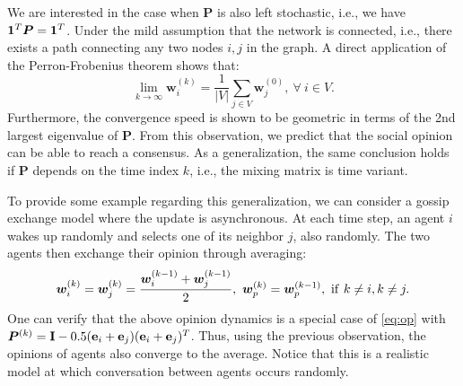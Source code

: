 \documentclass[10pt]{article}
\theoremstyle{t}
\begin{document}
We are interested in the case when ${\bm P}$ is also left stochastic, i.e., we have ${\bf 1}^T {\bm P} = {\bf 1}^T$. Under the mild assumption that the network is connected, i.e., there exists a path connecting any two nodes $i,j$ in the graph. A direct application of the Perron-Frobenius theorem shows that:
\[
\lim_{k \rightarrow \infty} {\bm w}_i^{(k)} = \frac{1}{|V|} \sum_{j \in V} {\bm w}_j^{(0)},~\forall~i \in V.
\]
Furthermore, the convergence speed is shown to be geometric in terms of the 2nd largest eigenvalue of ${\bm P}$.  From this observation, we predict that the social opinion can be able to reach a consensus. As a generalization, the same conclusion holds if ${\bm P}$ depends on the time index $k$, i.e., the mixing matrix is time variant. \vspace{.2cm}

To provide some example regarding this generalization, we can consider a gossip exchange model where the update is asynchronous. At each time step, an agent $i$ wakes up randomly and selects one of its neighbor $j$, also randomly. The two agents then exchange their opinion through averaging:
\[
{\bm w}_i^{(k)} = {\bm w}_j^{(k)} = \frac{{\bm w}_i^{(k-1)} + {\bm w}_j^{(k-1)} }{2},~{\bm w}_p^{(k)} = {\bm w}_p^{(k-1)},~{\rm if}~k \neq i, k \neq j.
\] 
One can verify that the above opinion dynamics is a special case of \eqref{eq:op} with ${\bm P}^{(k)} = {\bf I} - 0.5({\bf e}_i + {\bf e}_j)({\bf e}_i + {\bf e}_j)^T$. Thus, using the previous observation, the opinions of agents also converge to the average. Notice that this is a realistic model at which conversation between agents occurs randomly. \vspace{.2cm}
\end{document}
